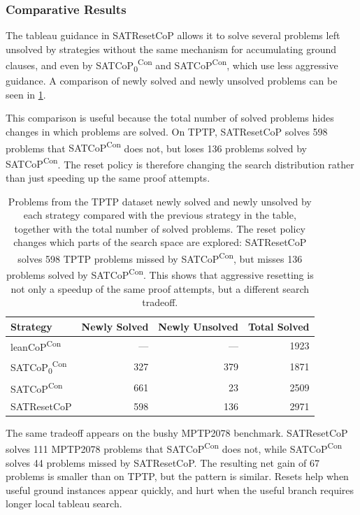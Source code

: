 \documentclass{EasyChair3.5/easychair}
\newcommand{\cop}[1]{\textsf{#1}}
\newcommand{\leancopc}{\cop{leanCoP\textsuperscript{Con}}}
\newcommand{\satcopzc}{\cop{SATCoP\textsubscript{0}\textsuperscript{Con}}}
\newcommand{\satcopc}{\cop{SATCoP\textsuperscript{Con}}}
\begin{document}
\subsubsection{Comparative Results}
\label{comparative_results}

The tableau guidance in \cop{SATResetCoP} allows it to solve several problems left unsolved by strategies without the same mechanism for accumulating ground clauses, and even by \satcopzc{} and \satcopc{}, which use less aggressive guidance.
A comparison of newly solved and newly unsolved problems can be seen in \cref{newly_solved_table}.

This comparison is useful because the total number of solved problems hides changes in which problems are solved.
On TPTP, \cop{SATResetCoP} solves \num{598} problems that \satcopc{} does not, but loses \num{136} problems solved by \satcopc{}.
The reset policy is therefore changing the search distribution rather than just speeding up the same proof attempts.

\begin{table}[h]
	\centering
	\footnotesize
	\begin{tabular}{l r r r}
		\toprule
			Strategy & Newly Solved & Newly Unsolved & Total Solved \\
			\midrule
				\leancopc{}       & ---  & --- & 1923 \\
				\satcopzc{}       & 327  & 379 & 1871 \\
				\satcopc{}        & 661  & 23  & 2509 \\
				\cop{SATResetCoP} & 598  & 136 & 2971 \\
			\bottomrule
		\end{tabular}
	\caption{Problems from the TPTP dataset newly solved and newly unsolved by each strategy compared with the previous strategy in the table, together with the total number of solved problems. The reset policy changes which parts of the search space are explored: \cop{SATResetCoP} solves \num{598} TPTP problems missed by \satcopc{}, but misses \num{136} problems solved by \satcopc{}. This shows that aggressive resetting is not only a speedup of the same proof attempts, but a different search tradeoff.}
		\label{newly_solved_table}
\end{table}

The same tradeoff appears on the bushy \cop{MPTP2078} benchmark.
\cop{SATResetCoP} solves \num{111} MPTP2078 problems that \satcopc{} does not, while \satcopc{} solves \num{44} problems missed by \cop{SATResetCoP}.
The resulting net gain of \num{67} problems is smaller than on TPTP, but the pattern is similar.
Resets help when useful ground instances appear quickly, and hurt when the useful branch requires longer local tableau search.
\end{document}
